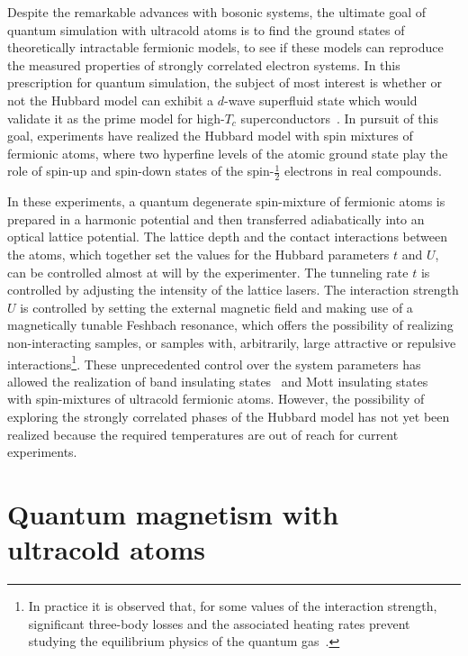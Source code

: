 \documentclass[oneside,11pt]{memoir}
\begin{document}
Despite the remarkable advances with bosonic systems, the ultimate goal of
quantum simulation with ultracold atoms is to find the ground states of
theoretically intractable fermionic models, to see if these models can
reproduce the measured properties of strongly correlated electron systems.  In
this prescription for quantum simulation, the subject of most interest is
whether or not the Hubbard model can exhibit a $d$-wave superfluid state which
would validate it as the prime model for high-$T_{c}$
superconductors~\cite{Scalapino1995329,PhysRevLett.89.220407}.  In pursuit of
this goal, experiments have realized the Hubbard model with spin mixtures of
fermionic atoms, where two hyperfine levels of the atomic ground state play the
role of spin-up and spin-down states of the spin-$\frac{1}{2}$ electrons in
real compounds. 

In these experiments, a quantum degenerate spin-mixture of fermionic atoms is
prepared in a harmonic potential and then transferred adiabatically into an
optical lattice potential.  The lattice depth and the contact interactions
between the atoms, which together set the values for the Hubbard parameters $t$
and $U$, can be controlled almost at will by the experimenter.  The tunneling
rate $t$ is controlled  by adjusting the intensity of the lattice lasers.  The
interaction strength $U$ is controlled by setting the external magnetic field
and making use of a magnetically tunable Feshbach resonance, which offers the
possibility of realizing non-interacting samples, or samples with, arbitrarily,
large  attractive or repulsive interactions\footnote{In practice it is observed
that, for some values of the interaction strength, significant three-body
losses and the associated heating rates prevent studying the equilibrium
physics of the quantum gas~\cite{PhysRevA.85.063615}.}.  These unprecedented
control over the system parameters has allowed the realization of band
insulating states~\cite{Kohl2005} and Mott insulating
states~\cite{Jordens2008,Schneider2008} with spin-mixtures of ultracold
fermionic atoms.  However, the possibility of exploring the strongly correlated
phases of the Hubbard model has not yet been realized because the required
temperatures are out of reach for current experiments.    


 
\section{Quantum magnetism with ultracold atoms }
\end{document}
